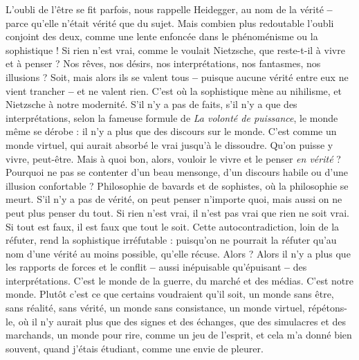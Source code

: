 L’oubli de l’être se fit parfois, nous rappelle Heidegger, au nom de la vérité
{\bf --} parce qu’elle n’était vérité que du sujet. Mais combien plus redoutable
l’oubli conjoint des deux, comme une lente enfoncée dans le phénoménisme
ou la sophistique ! Si rien n’est vrai, comme le voulait Nietzsche, que reste-t-il
à vivre et à penser ? Nos rêves, nos désirs, nos interprétations, nos fantasmes,
nos illusions ? Soit, mais alors ils se valent tous {\bf --} puisque aucune vérité entre
eux ne vient trancher {\bf --} et ne valent rien. C’est où la sophistique mène au nihilisme,
et Nietzsche à notre modernité. S’il n’y a pas de faits, s’il n’y a que des
interprétations, selon la fameuse formule de {\it La volonté de puissance}, le monde
même se dérobe : il n’y a plus que des discours sur le monde. C’est comme un
monde virtuel, qui aurait absorbé le vrai jusqu’à le dissoudre. Qu’on puisse y
vivre, peut-être. Mais à quoi bon, alors, vouloir le vivre et le penser {\it en vérité} ?
Pourquoi ne pas se contenter d’un beau mensonge, d’un discours habile ou
d’une illusion confortable ? Philosophie de bavards et de sophistes, où la philosophie
se meurt. S’il n’y a pas de vérité, on peut penser n’importe quoi, mais
aussi on ne peut plus penser du tout. Si rien n’est vrai, il n’est pas vrai que rien
ne soit vrai. Si tout est faux, il est faux que tout le soit. Cette autocontradiction,
loin de la réfuter, rend la sophistique irréfutable : puisqu'on ne pourrait la
réfuter qu’au nom d’une vérité au moins possible, qu’elle récuse. Alors ? Alors
il n’y a plus que les rapports de forces et le conflit {\bf --} aussi inépuisable qu’épuisant
{\bf --} des interprétations. C’est le monde de la guerre, du marché et des
médias. C’est notre monde. Plutôt c’est ce que certains voudraient qu’il soit, un
monde sans être, sans réalité, sans vérité, un monde sans consistance, un
monde virtuel, répétons-le, où il n’y aurait plus que des signes et des échanges,
que des simulacres et des marchands, un monde pour rire, comme un jeu de
l'esprit, et cela m’a donné bien souvent, quand j'étais étudiant, comme une
envie de pleurer.

